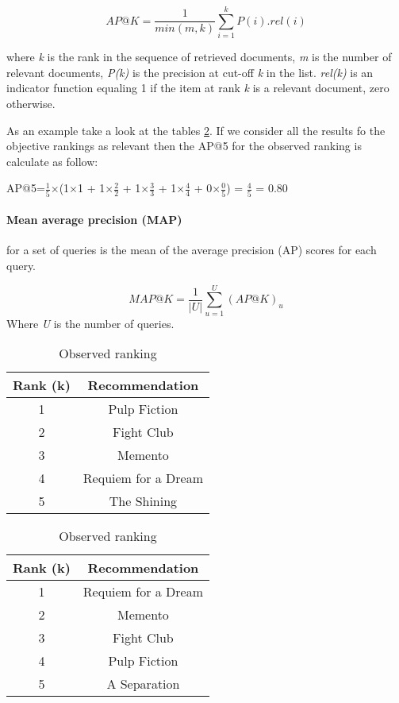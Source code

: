 \begin{equation}
	AP@K = \frac{1}{min(m,k)}\sum_{i=1}^{k}P(i).rel(i)
	\label{eq:ap@k}
\end{equation}

where \emph{k} is the rank in the sequence of retrieved documents, \emph{m} is the number of relevant documents, \emph{P(k)} is the precision at cut-off \emph{k} in the list. \emph{rel(k)}
is an indicator function equaling 1 if the item at rank \emph{k} is a relevant document, zero otherwise.

As an example take a look at the tables \ref{tab:apk-example}. If we consider all the results fo the objective rankings as relevant then the AP@5 for the observed ranking is calculate as follow:

AP@5=$\frac{1}{5}$$\times$(1$\times$1 + 1$\times$$\frac{2}{2}$ + 1$\times$$\frac{3}{3}$ + 1$\times$$\frac{4}{4}$ + 0$\times$$\frac{0}{5}$) = $\frac{4}{5}$ = 0.80

\paragraph*{Mean average precision (MAP)} for a set of queries is the mean of the average precision (AP) scores for each query.

\begin{equation}
	MAP@K = \frac{1}{|U|}\sum_{u=1}^{U}(AP@K)_{u}
	\label{eq:map@k}
\end{equation}
Where \emph{U} is the number of queries.

\begin{table}[!ht]
	\caption{Comparing results of objective and observed ranking}
	\label{tab:apk-example}
	\begin{subtable}{.5\linewidth}
		\caption{Objective ranking}
		\centering
		\begin{tabular}{c|c}
			\textbf{Rank (k)}&\textbf{Recommendation} \\
			\hline
			1 & Pulp Fiction \\
			2 & Fight Club \\
			3 & Memento \\
			4 & Requiem for a Dream \\
			5 & The Shining \\
		\end{tabular}
	\end{subtable}%
	\begin{subtable}{.5\linewidth}
		\caption{Observed ranking}
		\centering
		\begin{tabular}{c|c}
			\textbf{Rank (k)}&\textbf{Recommendation} \\
			\hline
			1 & Requiem for a Dream \\
			2 & Memento \\
			3 & Fight Club \\
			4 & Pulp Fiction \\
			5 & A Separation  \\
		\end{tabular}
	\end{subtable}%
\end{table}

